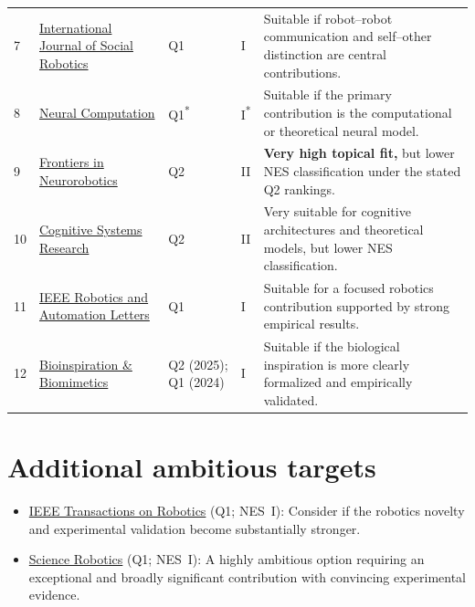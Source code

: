 \documentclass[a4paper,11pt]{article}
\begin{document}
\begin{longtable}{@{}L{0.045\textwidth}L{0.245\textwidth}L{0.070\textwidth}L{0.065\textwidth}L{0.460\textwidth}@{}}
7 & \href{https://link.springer.com/journal/12369}{International Journal of Social Robotics}
& Q1 & I & Suitable if robot--robot communication and self--other distinction are central contributions.\\

8 & \href{https://direct.mit.edu/neco}{Neural Computation}
& Q1\textsuperscript{*} & I\textsuperscript{*} & Suitable if the primary contribution is the computational or theoretical neural model.\\

9 & \href{https://www.frontiersin.org/journals/neurorobotics}{Frontiers in Neurorobotics}
& Q2 & II & \textbf{Very high topical fit,} but lower NES classification under the stated Q2 rankings.\\

10 & \href{https://www.sciencedirect.com/journal/cognitive-systems-research}{Cognitive Systems Research}
& Q2 & II & Very suitable for cognitive architectures and theoretical models, but lower NES classification.\\

11 & \href{https://www.ieee-ras.org/publications/ra-l/}{IEEE Robotics and Automation Letters}
& Q1 & I & Suitable for a focused robotics contribution supported by strong empirical results.\\

12 & \href{https://iopscience.iop.org/journal/1748-3190}{Bioinspiration \& Biomimetics}
& Q2 (2025); Q1 (2024) & I & Suitable if the biological inspiration is more clearly formalized and empirically validated.\\

\end{longtable}

\normalsize
\section*{Additional ambitious targets}
\begin{itemize}
  \item \href{https://www.ieee-ras.org/publications/t-ro/}{IEEE Transactions on Robotics}
  (Q1; NES~I): Consider if the robotics novelty and experimental validation
  become substantially stronger.
  \item \href{https://www.science.org/journal/scirobotics}{Science Robotics}
  (Q1; NES~I): A highly ambitious option requiring an exceptional and
  broadly significant contribution with convincing experimental evidence.
\end{itemize}
\end{document}
